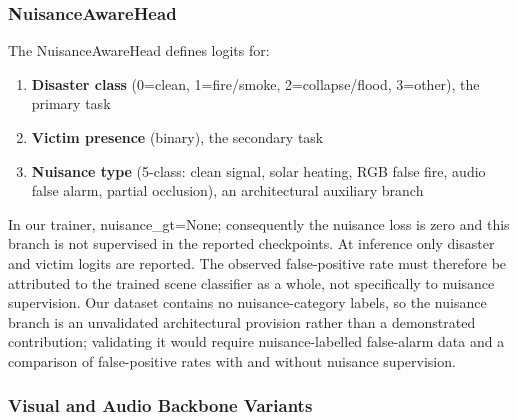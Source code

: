 \documentclass[journal]{IEEEtran}
\begin{document}
\subsubsection{NuisanceAwareHead}

The NuisanceAwareHead defines logits for:
\begin{enumerate}
    \item \textbf{Disaster class} (0=clean, 1=fire/smoke, 2=collapse/flood, 3=other), the primary task
    \item \textbf{Victim presence} (binary), the secondary task
    \item \textbf{Nuisance type} (5-class: clean signal, solar heating, RGB false fire, audio false alarm, partial occlusion), an architectural auxiliary branch
\end{enumerate}

In our trainer, nuisance\_gt=None; consequently the nuisance loss is zero and this branch is not supervised in the reported checkpoints. At inference only disaster and victim logits are reported. The observed false-positive rate must therefore be attributed to the trained scene classifier as a whole, not specifically to nuisance supervision. Our dataset contains no nuisance-category labels, so the nuisance branch is an unvalidated architectural provision rather than a demonstrated contribution; validating it would require nuisance-labelled false-alarm data and a comparison of false-positive rates with and without nuisance supervision.

\subsubsection{Visual and Audio Backbone Variants}
\end{document}
